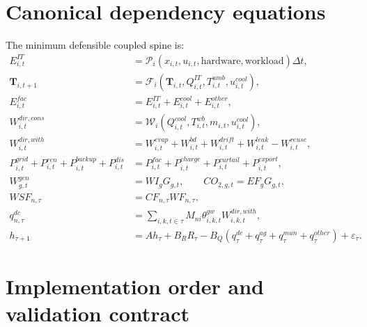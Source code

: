 \documentclass[10pt]{article}
\begin{document}
\section{Canonical dependency equations}
The minimum defensible coupled spine is:
\begin{align}
E^{IT}_{i,t}
&=\mathcal P_i(x_{i,t},u_{i,t},\text{hardware},\text{workload})\Delta t,\\
\mathbf T_{i,t+1}
&=\mathcal F_i(\mathbf T_{i,t},Q^{IT}_{i,t},T^{amb}_{i,t},u^{cool}_{i,t}),\\
E^{fac}_{i,t}
&=E^{IT}_{i,t}+E^{cool}_{i,t}+E^{other}_{i,t},\\
W^{dir,cons}_{i,t}
&=\mathcal W_i(Q^{cool}_{i,t},T^{wb}_{i,t},m_{i,t},u^{cool}_{i,t}),\\
W^{dir,with}_{i,t}
&=W^{evap}_{i,t}+W^{bd}_{i,t}+W^{drift}_{i,t}+W^{leak}_{i,t}-W^{reuse}_{i,t},\\
P^{grid}_{i,t}+P^{ren}_{i,t}+P^{backup}_{i,t}+P^{dis}_{i,t}
&=P^{fac}_{i,t}+P^{charge}_{i,t}+P^{curtail}_{i,t}+P^{export}_{i,t},\\
W^{gen}_{g,t}&=WI_gG_{g,t},\qquad
CO_{2,g,t}=EF_gG_{g,t},\\
WSF_{n,\tau}&=CF_{n,\tau}WF_{n,\tau},\\
q^{dc}_{n,\tau}
&=\sum_{i,k,t\in\tau}M_{ni}\theta^{gw}_{i,k,t}W^{dir,with}_{i,k,t},\\
h_{\tau+1}
&=Ah_\tau+B_RR_\tau-B_Q(q^{dc}_\tau+q^{ag}_\tau+q^{mun}_\tau+q^{other}_\tau)+\varepsilon_\tau.
\end{align}

\section{Implementation order and validation contract}
\end{document}
